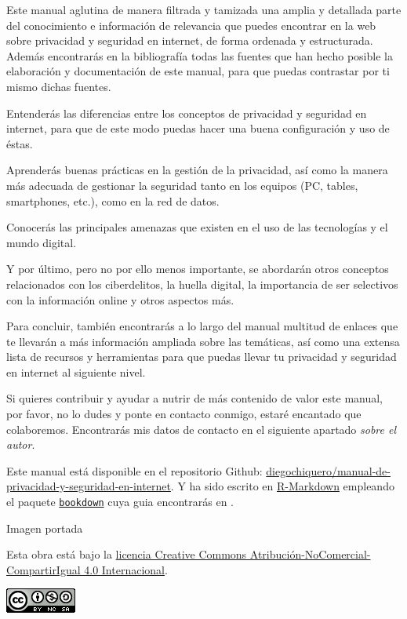 \documentclass[
  spanish,
  a4paper,
  openany]{book}
\begin{document}
Este manual aglutina de manera filtrada y tamizada una amplia y detallada parte del conocimiento e información de relevancia que puedes encontrar en la web sobre privacidad y seguridad en internet, de forma ordenada y estructurada. Además encontrarás en la bibliografía todas las fuentes que han hecho posible la elaboración y documentación de este manual, para que puedas contrastar por ti mismo dichas fuentes.

Entenderás las diferencias entre los conceptos de privacidad y seguridad en internet, para que de este modo puedas hacer una buena configuración y uso de éstas.

Aprenderás buenas prácticas en la gestión de la privacidad, así como la manera más adecuada de gestionar la seguridad tanto en los equipos (PC, tables, smartphones, etc.), como en la red de datos.

Conocerás las principales amenazas que existen en el uso de las tecnologías y el mundo digital.

Y por último, pero no por ello menos importante, se abordarán otros conceptos relacionados con los ciberdelitos, la huella digital, la importancia de ser selectivos con la información online y otros aspectos más.

Para concluir, también encontrarás a lo largo del manual multitud de enlaces que te llevarán a más información ampliada sobre las temáticas, así como una extensa lista de recursos y herramientas para que puedas llevar tu privacidad y seguridad en internet al siguiente nivel.

Si quieres contribuir y ayudar a nutrir de más contenido de valor este manual, por favor, no lo dudes y ponte en contacto conmigo, estaré encantado que colaboremos. Encontrarás mis datos de contacto en el siguiente apartado \emph{sobre el autor}.

Este manual está disponible en el repositorio Github: \href{https://github.com/diegochiquero/manual-de-privacidad-y-seguridad-en-internet}{diegochiquero/manual-de-privacidad-y-seguridad-en-internet}. Y ha sido escrito en \href{http://rmarkdown.rstudio.com}{R-Markdown} empleando el paquete \href{https://bookdown.org/}{\texttt{bookdown}} cuya guia encontrarás en \citep{R-bookdown}.

Imagen portada \citep{freepik}

Esta obra está bajo la \href{https://creativecommons.org/licenses/by-nc-sa/4.0/deed.es}{licencia Creative Commons Atribución-NoComercial-CompartirIgual 4.0 Internacional}.

\begin{flushleft}\includegraphics{images/by-nc-sa-88x31} \end{flushleft}
\end{document}
